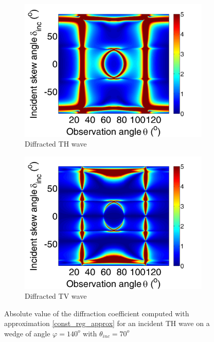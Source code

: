 \begin{figure}[h]
\centering
\begin{subfigure}[b]{0.45\textwidth}
        \includegraphics[width=\textwidth]{images/chapter4/const_reg/XpropTH_140_70_TH.png}
        \caption{Diffracted TH wave}
        \label{const_reg:DTH}
    \end{subfigure}
   \begin{subfigure}[b]{0.45\textwidth}
        \includegraphics[width=\textwidth]{images/chapter4/const_reg/XpropTV_140_70_TH.png}
        \caption{Diffracted TV wave}
        \label{const_reg:DTV}
    \end{subfigure} 
\caption{Absolute value of the diffraction coefficient computed with approximation \eqref{const_reg_approx} for an incident TH wave on a wedge of angle $\varphi=140^o$ with $\theta_{inc}=70^o$}
\label{const_reg:D}
\end{figure}

